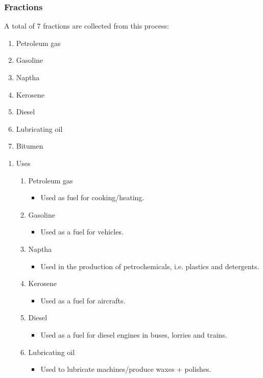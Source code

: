 \documentclass[11pt]{article}
\begin{document}
\subsubsection{Fractions}
\label{sec:org8bcd731}
A total of 7 fractions are collected from this process:
\begin{enumerate}
\item Petroleum gas
\item Gasoline
\item Naptha
\item Kerosene
\item Diesel
\item Lubricating oil
\item Bitumen
\end{enumerate}
\begin{enumerate}
\item Uses
\label{sec:org865959e}
\begin{enumerate}
\item Petroleum gas
\begin{itemize}
\item Used as fuel for cooking/heating.
\end{itemize}
\item Gasoline
\begin{itemize}
\item Used as a fuel for vehicles.
\end{itemize}
\item Naptha
\begin{itemize}
\item Used in the production of petrochemicals, i.e. plastics and detergents.
\end{itemize}
\item Kerosene
\begin{itemize}
\item Used as a fuel for aircrafts.
\end{itemize}
\item Diesel
\begin{itemize}
\item Used as a fuel for diesel engines in buses, lorries and trains.
\end{itemize}
\item Lubricating oil
\begin{itemize}
\item Used to lubricate machines/produce waxes + polishes.
\end{itemize}
\end{enumerate}
\end{enumerate}
\end{document}
